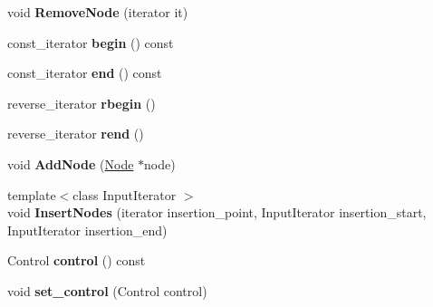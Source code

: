 \begin{DoxyCompactItemize}
void {\bfseries Remove\+Node} (iterator it)
\item 
\mbox{\label{classv8_1_1internal_1_1compiler_1_1BasicBlock_a71c7afdedf702a6e6437f4aba59b2373}} 
const\+\_\+iterator {\bfseries begin} () const
\item 
\mbox{\label{classv8_1_1internal_1_1compiler_1_1BasicBlock_ad9902022db8520b1dcdda2fae1da6c11}} 
const\+\_\+iterator {\bfseries end} () const
\item 
\mbox{\label{classv8_1_1internal_1_1compiler_1_1BasicBlock_a0e1862e1dc2f849b2be552b4ef3344b8}} 
reverse\+\_\+iterator {\bfseries rbegin} ()
\item 
\mbox{\label{classv8_1_1internal_1_1compiler_1_1BasicBlock_ad1aea0c78564098e4f9badfe96baf4bd}} 
reverse\+\_\+iterator {\bfseries rend} ()
\item 
\mbox{\label{classv8_1_1internal_1_1compiler_1_1BasicBlock_a7f6e2222fc8c1b4a8e66294c6702dd2c}} 
void {\bfseries Add\+Node} (\mbox{\hyperlink{classv8_1_1internal_1_1compiler_1_1Node}{Node}} $\ast$node)
\item 
\mbox{\label{classv8_1_1internal_1_1compiler_1_1BasicBlock_ad664af67c0a8d3eb3b1199ec644c885a}} 
{\footnotesize template$<$class Input\+Iterator $>$ }\\void {\bfseries Insert\+Nodes} (iterator insertion\+\_\+point, Input\+Iterator insertion\+\_\+start, Input\+Iterator insertion\+\_\+end)
\item 
\mbox{\label{classv8_1_1internal_1_1compiler_1_1BasicBlock_a83694405e3297b67f1d0c2446633c6d5}} 
Control {\bfseries control} () const
\item 
\mbox{\label{classv8_1_1internal_1_1compiler_1_1BasicBlock_a701028f03924fab40523d6e7393a2c7c}} 
void {\bfseries set\+\_\+control} (Control control)
\item 
\mbox{\label{classv8_1_1internal_1_1compiler_1_1BasicBlock_a170af144ec8be9c1b331ac2a6082d0aa}} 

\end{DoxyCompactItemize}

